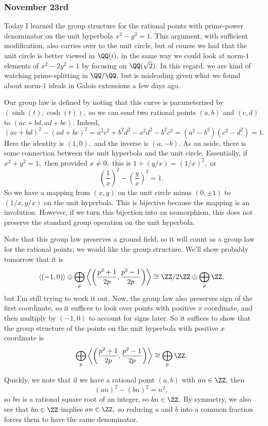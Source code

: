 \subsubsection{November 23rd}
Today I learned the group structure for the rational points with prime-power denominator on the unit hyperbola $x^2-y^2=1.$ This argument, with sufficient modification, also carries over to the unit circle, but of course we had that the unit circle is better viewed in $\QQ(i),$ in the same way we could look at norm-$1$ elements of $x^2-2y^2=1$ by focusing on $\QQ(\sqrt2).$ In this regard, we are kind of watching prime-splitting in $\QQ/\QQ,$ but is misleading given what we found about norm-$1$ ideals in Galois extensions a few days ago.

Our group law is defined by noting that this curve is parameterized by $(\sinh(t),\cosh(t)),$ so we can send two rational points $(a,b)$ and $(c,d)$ to $(ac+bd,ad+bc).$ Indeed,
\[(ac+bd)^2-(ad+bc)^2=a^2c^2+b^2d^2-a^2d^2-b^2c^2=\left(a^2-b^2\right)\left(c^2-d^2\right)=1.\]
Here the identity is $(1,0),$ and the inverse is $(a,-b).$ As an aside, there is some connection between the unit hyperbola and the unit circle. Essentially, if $x^2+y^2=1,$ then provided $x\ne0,$ this is $1+(y/x)=(1/x)^2,$ or
\[\left(\frac1x\right)^2-\left(\frac yx\right)^2=1.\]
So we have a mapping from $(x,y)$ on the unit circle minus $(0,\pm1)$ to $(1/x,y/x)$ on the unit hyperbola. This is bijective because the mapping is an involution. However, if we turn this bijection into an isomorphism, this does not preserve the standard group operation on the unit hyperbola.

Note that this group law preserves a ground field, so it will count as a group law for the rational points; we would like the group structure. We'll show probably tomorrow that it is
\[\langle(-1,0)\rangle\oplus\bigoplus_p\left\langle\left(\frac{p^2+1}{2p},\frac{p^2-1}{2p}\right)\right\rangle\cong\ZZ/2\ZZ\oplus\bigoplus_p\ZZ,\]
but I'm still trying to work it out. Now, the group law also preserves sign of the first coordinate, so it suffices to look over points with positive $x$ coordinate, and then multiply by $(-1,0)$ to account for signs later. So it suffices to show that the group structure of the points on the unit hyperbola with positive $x$ coordinate is
\[\bigoplus_p\left\langle\left(\frac{p^2+1}{2p},\frac{p^2-1}{2p}\right)\right\rangle\cong\bigoplus_p\ZZ.\]

Quickly, we note that if we have a rational point $(a,b)$ with $an\in\ZZ,$ then
\[(an)^2-(bn)^2=n^2,\]
so $bn$ is a rational square root of an integer, so $bn\in\ZZ.$ By symmetry, we also see that $bn\in\ZZ$ implies $an\in\ZZ,$ so reducing $a$ and $b$ into a common fraction forces them to have the same denominator.

